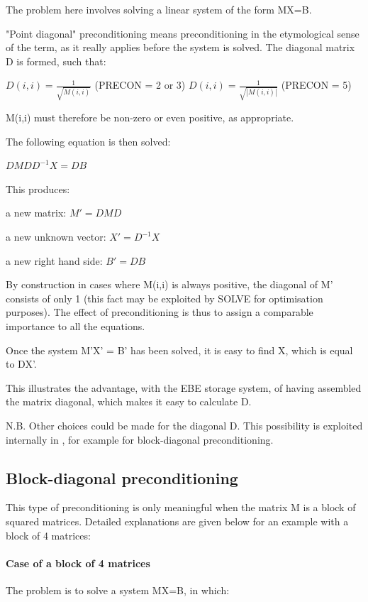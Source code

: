 The problem here involves solving a linear system of the form MX=B.

"Point diagonal" preconditioning means preconditioning in the etymological
sense of the term, as it really applies before the system is solved. The
diagonal matrix D is formed, such that:

$D(i,i)=\frac{1}{\sqrt{M(i,i)} } $ (PRECON = 2 or 3)
$D(i,i)=\frac{1}{\sqrt{\left|M(i,i)\right|} } $   (PRECON = 5)

M(i,i) must therefore be non-zero or even positive, as appropriate.

The following equation is then solved:

$DMDD^{-1}X  =  DB$

This produces:

a new matrix: $M' = DMD$

a new unknown vector: $X' = D^{-1}X$

a new right hand side: $B' = DB$

By construction in cases where M(i,i) is always positive, the diagonal of M'
consists of only 1 (this fact may be exploited by SOLVE for optimisation
purposes). The effect of preconditioning is thus to assign a comparable
importance to all the equations.

Once the system M'X' = B' has been solved, it is easy to find X, which is equal
to DX'.

This illustrates the advantage, with the EBE storage system, of having
assembled the matrix diagonal, which makes it easy to calculate D.

N.B. Other choices could be made for the diagonal D. This possibility is
exploited internally in \bief, for example for block-diagonal preconditioning.

\subsection{Block-diagonal preconditioning}

This type of preconditioning is only meaningful when the matrix M is a block of
squared matrices. Detailed explanations are given below for an example with a
block of 4 matrices:




\paragraph{Case of a block of 4 matrices}

The problem is to solve a system MX=B, in which:

